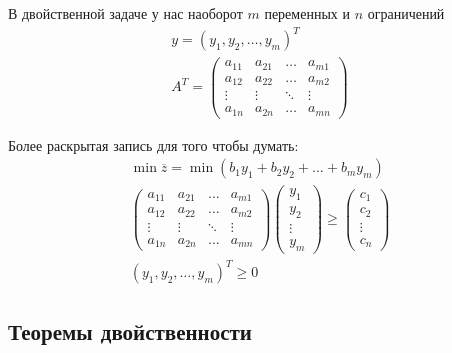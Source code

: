 \documentclass[a4paper,article,14pt]{extarticle}
\begin{document}
В двойственной задаче у нас наоборот \(m\) переменных и \(n\) ограничений
\begin{equation}
    \begin{gathered}
        y = (y_1, y_2, \ldots, y_m)^T \\
        A^T =
        \begin{pmatrix}
            a_{11} & a_{21} & \ldots & a_{m1} \\
            a_{12} & a_{22} & \ldots & a_{m2} \\
            \vdots & \vdots & \ddots & \vdots \\
            a_{1n} & a_{2n} & \ldots & a_{mn}
        \end{pmatrix}
    \end{gathered}
\end{equation}

Более раскрытая запись для того чтобы думать:
\begin{equation}
    \begin{gathered}
        \min \overline z = \min (b_1y_1 + b_2y_2 + \ldots + b_my_m) \\
        \begin{pmatrix}
            a_{11} & a_{21} & \ldots & a_{m1} \\
            a_{12} & a_{22} & \ldots & a_{m2} \\
            \vdots & \vdots & \ddots & \vdots \\
            a_{1n} & a_{2n} & \ldots & a_{mn}
        \end{pmatrix}
        \begin{pmatrix}
            y_1 \\ y_2 \\ \vdots \\ y_m
        \end{pmatrix}
        \ge
        \begin{pmatrix}
            c_1 \\ c_2 \\ \vdots \\ c_n
        \end{pmatrix}
        \\
        (y_1, y_2, \ldots, y_m)^T \ge 0
    \end{gathered}
\end{equation}

\subsection{Теоремы двойственности}
\end{document}
